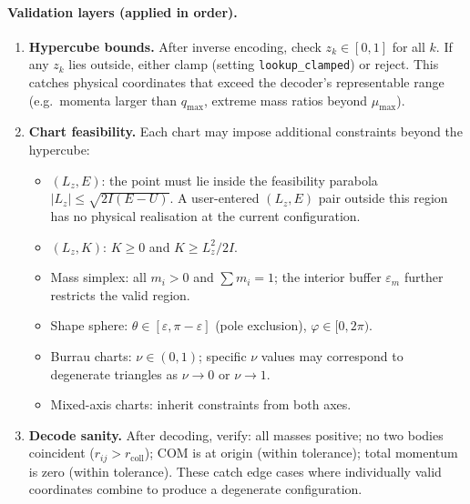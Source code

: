 \documentclass[11pt]{report}
\begin{document}
\paragraph{Validation layers (applied in order).}
\begin{enumerate}[nosep]
\item \textbf{Hypercube bounds.} After inverse encoding, check $z_k\in[0,1]$ for all $k$. If any $z_k$ lies outside, either clamp (setting \texttt{lookup\_clamped}) or reject. This catches physical coordinates that exceed the decoder's representable range (e.g.\ momenta larger than $q_{\max}$, extreme mass ratios beyond $\mu_{\max}$).
\item \textbf{Chart feasibility.} Each chart may impose additional constraints beyond the hypercube:
\begin{itemize}[nosep]
\item $(L_z,E)$: the point must lie inside the feasibility parabola $|L_z|\le\sqrt{2I(E-U)}$. A user-entered $(L_z,E)$ pair outside this region has no physical realisation at the current configuration.
\item $(L_z,K)$: $K\ge 0$ and $K\ge L_z^2/2I$.
\item Mass simplex: all $m_i>0$ and $\sum m_i=1$; the interior buffer $\varepsilon_m$ further restricts the valid region.
\item Shape sphere: $\theta\in[\varepsilon,\pi-\varepsilon]$ (pole exclusion), $\varphi\in[0,2\pi)$.
\item Burrau charts: $\nu\in(0,1)$; specific $\nu$ values may correspond to degenerate triangles as $\nu\to 0$ or $\nu\to 1$.
\item Mixed-axis charts: inherit constraints from both axes.
\end{itemize}
\item \textbf{Decode sanity.} After decoding, verify: all masses positive; no two bodies coincident ($r_{ij}>r_{\mathrm{coll}}$); COM is at origin (within tolerance); total momentum is zero (within tolerance). These catch edge cases where individually valid coordinates combine to produce a degenerate configuration.
\end{enumerate}
\end{document}
